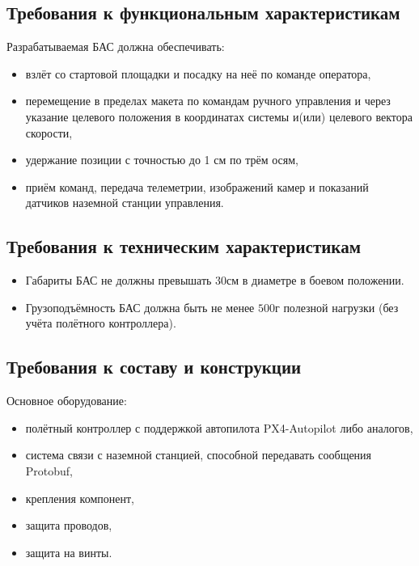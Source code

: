 \documentclass[a4paper, 14pt]{extarticle}
\begin{document}
\subsection{Требования к функциональным характеристикам}

Разрабатываемая БАС должна обеспечивать:

\begin{itemize}
  \item взлёт со стартовой площадки и посадку на неё по команде оператора,
  \item перемещение в пределах макета по командам ручного управления и через указание целевого положения в координатах системы и(или) целевого вектора скорости,
  \item удержание позиции с точностью до 1 см по трём осям,
  \item приём команд, передача телеметрии, изображений камер и показаний датчиков наземной станции управления.
\end{itemize}

\subsection{Требования к техническим характеристикам}

\begin{itemize}
  \item Габариты БАС не должны превышать $30 \textit{см}$ в диаметре в боевом положении.
  \item Грузоподъёмность БАС должна быть не менее $500 \textit{г}$ полезной нагрузки (без учёта полётного контроллера).
\end{itemize}

\subsection{Требования к составу и конструкции}

Основное оборудование:

\begin{itemize}
  \item полётный контроллер с поддержкой автопилота PX4-Autopilot либо аналогов,
  \item система связи с наземной станцией, способной передавать сообщения Protobuf,
  \item крепления компонент,
  \item защита проводов,
  \item защита на винты.
\end{itemize}
\end{document}
